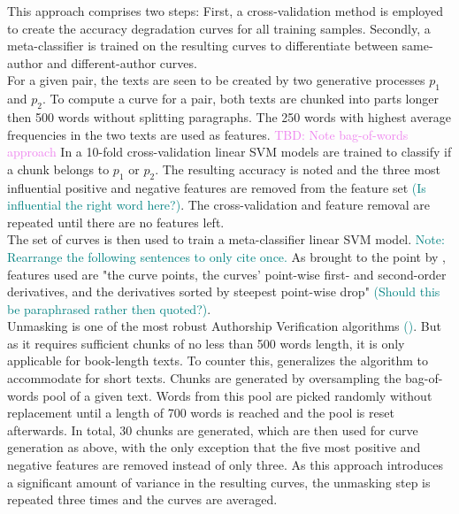 This approach comprises two steps: First, a cross-validation method is employed to create the accuracy degradation curves for all training samples.
Secondly, a meta-classifier is trained on the resulting curves to differentiate between same-author and different-author curves.\\
For a given pair, the texts are seen to be created by two generative processes $p_1$ and $p_2$.
To compute a curve for a pair, both texts are chunked into parts longer then 500 words without splitting paragraphs.
The 250 words with highest average frequencies in the two texts are used as features.
\textcolor{violet}{TBD: Note bag-of-words approach}
In a 10-fold cross-validation linear SVM models are trained to classify if a chunk belongs to $p_1$ or $p_2$.
The resulting accuracy is noted and the three most influential positive and negative features are removed from the feature set \textcolor{teal}{(Is influential the right word here?)}.
The cross-validation and feature removal are repeated until there are no features left.\\
The set of curves is then used to train a meta-classifier linear SVM model.
\textcolor{teal}{Note: Rearrange the following sentences to only cite \cite{bevendorff2019unmaskingShortTexts} once.}
As brought to the point by \cite{bevendorff2019unmaskingShortTexts}, features used are "the curve points, the curves' point-wise first- and second-order derivatives, and the derivatives sorted by steepest point-wise drop" \textcolor{teal}{(Should this be paraphrased rather then quoted?)}.\\
Unmasking is one of the most robust Authorship Verification algorithms \textcolor{teal}{(\cite{bevendorff2019unmaskingShortTexts})}.
But as it requires sufficient chunks of no less than 500 words length, it is only applicable for book-length texts.
To counter this, \cite{bevendorff2019unmaskingShortTexts} generalizes the algorithm to accommodate for short texts.
Chunks are generated by oversampling the bag-of-words pool of a given text.
Words from this pool are picked randomly without replacement until a length of 700 words is reached and the pool is reset afterwards.
In total, 30 chunks are generated, which are then used for curve generation as above, with the only exception that the five most positive and negative features are removed instead of only three.
As this approach introduces a significant amount of variance in the resulting curves, the unmasking step is repeated three times and the curves are averaged.
